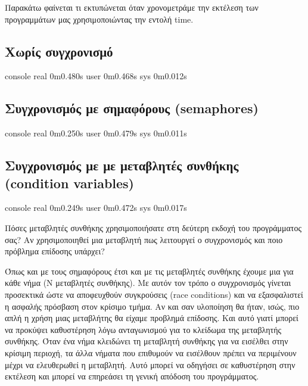 \documentclass[12pt]{article}
\begin{document}
Παρακάτω φαίνεται τι εκτυπώνεται όταν χρονομετράμε την εκτέλεση των προγραμμάτων
μας χρησιμοποιώντας την εντολή time.

\subsection*{Χωρίς συγχρονισμό}

\begin{codeless}{console}
real    0m0.480s
user    0m0.468s
sys     0m0.012s
\end{codeless}

\subsection*{Συγχρονισμός με σημαφόρους (semaphores)}

\begin{codeless}{console}
real    0m0.250s
user    0m0.479s
sys     0m0.011s
\end{codeless}

\subsection*{Συγχρονισμός με με μεταβλητές συνθήκης (condition variables)}

\begin{codeless}{console}
real    0m0.249s
user    0m0.472s
sys     0m0.017s
\end{codeless}

\pagebreak

\begin{question}
Πόσες μεταβλητές συνθήκης χρησιμοποιήσατε στη δεύτερη εκδοχή του
προγράμματος σας? Αν χρησιμοποιηθεί μια μεταβλητή πως λειτουργεί ο
συγχρονισμός και ποιο πρόβλημα επίδοσης υπάρχει?
\end{question}

Όπως και με τους σημαφόρους έτσι και με τις μεταβλητές συνθήκης έχουμε μια
για κάθε νήμα (Ν μεταβλητές συνθήκης). Με αυτόν τον τρόπο ο συγχρονισμός γίνεται 
προσεκτικά ώστε να αποφευχθούν συγκρούσεις (race conditions) και να εξασφαλιστεί 
η ασφαλής πρόσβαση στον κρίσιμο τμήμα. Αν και σαν υλοποίηση θα ήταν, ισώς, πιο απλή
η χρήση μιας μεταβλήτης θα είχαμε προβλημά επίδοσης. Και αυτό γιατί μπορεί να προκύψει
καθυστέρηση λόγω ανταγωνισμού για το κλείδωμα της μεταβλητής συνθήκης. 
Όταν ένα νήμα κλειδώνει τη μεταβλητή συνθήκης για να εισέλθει στην κρίσιμη περιοχή, 
τα άλλα νήματα που επιθυμούν να εισέλθουν πρέπει να περιμένουν μέχρι να ελευθερωθεί 
η μεταβλητή. Αυτό μπορεί να οδηγήσει σε καθυστέρηση στην εκτέλεση και μπορεί να 
επηρεάσει τη γενική απόδοση του προγράμματος.
\end{document}
